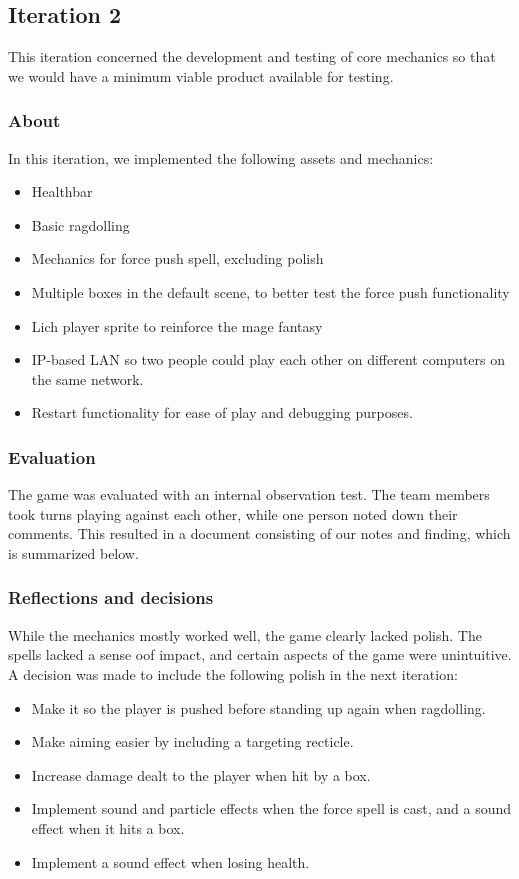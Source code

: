 \documentclass[conference]{IEEEtran}
\begin{document}
    \subsection{Iteration 2}
    This iteration concerned the development and testing of core mechanics so that we would have a minimum viable product available for testing.

    \subsubsection{About}
    In this iteration, we implemented the following assets and mechanics:
    \begin{itemize}
        \item Healthbar
        \item Basic ragdolling
        \item Mechanics for force push spell, excluding polish
        \item Multiple boxes in the default scene, to better test the force push functionality
        \item Lich player sprite to reinforce the mage fantasy
        \item IP-based LAN so two people could play each other on different computers on the same network.
        \item Restart functionality for ease of play and debugging purposes.
        
    \end{itemize}

    \subsubsection{Evaluation}
    The game was evaluated with an internal observation test. The team members took turns playing against each other, while one person noted down their comments. This resulted in a document consisting of our notes and finding, which is summarized below. 

    \subsubsection{Reflections and decisions} 

    While the mechanics mostly worked well, the game clearly lacked polish. The spells lacked a sense oof impact, and certain aspects of the game were unintuitive. A decision was made to include the following polish in the next iteration:
    \begin{itemize}
        \item Make it so the player is pushed before standing up again when ragdolling.
        \item Make aiming easier by including a targeting recticle.
        \item Increase damage dealt to the player when hit by a box.
        \item Implement sound and particle effects when the force spell is cast, and a sound effect when it hits a box.
        \item Implement a sound effect when losing health.
    \end{itemize}
\end{document}
